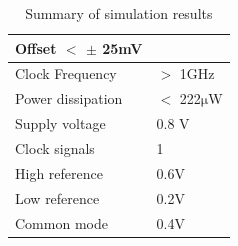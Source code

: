  
\begin{table}[htbp]
\centering
\renewcommand{\arraystretch}{1.3}
\caption{ Summary of simulation results}
\label{p1tab:p1_summary}
\begin{tabular}{l|l}
Offset
\begin{math}<\end{math} \begin{math}\pm{}\end{math} 25mV
 \\
\hline
Clock Frequency
&
\begin{math}>\end{math} 1GHz
 \\
\hline
Power dissipation
&
\begin{math}<\end{math} 222\begin{math}\mathrm{\mu}\end{math}W
 \\
\hline
Supply voltage
&
0.8 V
 \\
\hline
Clock signals
&
1
 \\
\hline
High reference
&
0.6V
 \\
\hline
Low reference
&
0.2V
 \\
\hline
Common mode
&
0.4V
 \\
\hline
\end{tabular}
\end{table}



 




 


